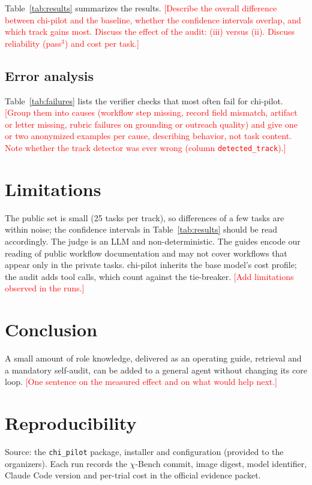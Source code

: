 \documentclass[conference]{IEEEtran}
\newcommand{\pending}[1]{\textcolor{red}{[#1]}}
\newcommand{\chib}{$\chi$-Bench}
\begin{document}
Table~\ref{tab:results} summarizes the results. \pending{Describe the overall difference
between chi-pilot and the baseline, whether the confidence intervals overlap, and which track
gains most. Discuss the effect of the audit: (iii) versus (ii). Discuss reliability (pass$^3$)
and cost per task.}

\subsection{Error analysis}
Table~\ref{tab:failures} lists the verifier checks that most often fail for chi-pilot.
\pending{Group them into causes (workflow step missing, record field mismatch, artifact or
letter missing, rubric failures on grounding or outreach quality) and give one or two
anonymized examples per cause, describing behavior, not task content. Note whether the track
detector was ever wrong (column \texttt{detected\_track}).}

\section{Limitations}
The public set is small (25 tasks per track), so differences of a few tasks are within noise;
the confidence intervals in Table~\ref{tab:results} should be read accordingly. The judge is an
LLM and non-deterministic. The guides encode our reading of public workflow documentation and
may not cover workflows that appear only in the private tasks. chi-pilot inherits the base
model's cost profile; the audit adds tool calls, which count against the tie-breaker.
\pending{Add limitations observed in the runs.}

\section{Conclusion}
A small amount of role knowledge, delivered as an operating guide, retrieval and a mandatory
self-audit, can be added to a general agent without changing its core loop.
\pending{One sentence on the measured effect and on what would help next.}

\section*{Reproducibility}
Source: the \texttt{chi\_pilot} package, installer and configuration (provided to the
organizers). Each run records the \chib{} commit, image digest, model identifier, Claude Code
version and per-trial cost in the official evidence packet.
\end{document}
